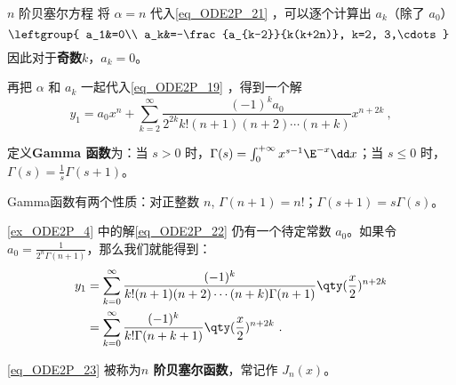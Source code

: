 \begin{example}{$n$ 阶贝塞尔方程}
将 $\alpha=n$ 代入\autoref{eq_ODE2P_21} ，可以逐个计算出 $a_k$（除了 $a_0$）
\begin{equation}
\leftgroup{
    a_1&=0\\
    a_k&=-\frac{a_{k-2}}{k(k+2n)}, k=2, 3,\cdots
}~
\end{equation}
因此对于\textbf{奇数}$k$，$a_k=0$。

再把 $\alpha$ 和 $a_k$ 一起代入\autoref{eq_ODE2P_19} ，得到一个解
\begin{equation}\label{eq_ODE2P_22}
y_1=a_0x^n+\sum\limits^\infty_{k=2}\frac{(-1)^ka_0}{2^{2k}k!(n+1)(n+2)\cdots(n+k)}x^{n+2k}~,
\end{equation}


定义\textbf{Gamma 函数}为：当 $s>0$ 时，$\Gamma(s)=\int_0^{+\infty}x^{s-1}\E^{-x}\dd x$；当 $s\leq 0$ 时，$\Gamma(s)=\frac{1}{s}\Gamma(s+1)$。

Gamma函数有两个性质：对正整数 $n$, $\Gamma(n+1)=n!$；$\Gamma(s+1)=s\Gamma(s)$。

\autoref{ex_ODE2P_4}  中的解\autoref{eq_ODE2P_22} 仍有一个待定常数 $a_0$。如果令 $a_0=\frac{1}{2^n\Gamma(n+1)}$，那么我们就能得到：
\begin{equation}\label{eq_ODE2P_23}
\begin{aligned}
y_1&=\sum\limits^\infty_{k=0}\frac{(-1)^k}{k!(n+1)(n+2)\cdots(n+k)\Gamma(n+1)}\qty(\frac{x}{2})^{n+2k}\\
 &=\sum\limits^\infty_{k=0}\frac{(-1)^k}{k!\Gamma(n+k+1)}\qty(\frac{x}{2})^{n+2k}~.
\end{aligned}
\end{equation}

\autoref{eq_ODE2P_23} 被称为\textbf{$n$ 阶贝塞尔函数}，常记作 $J_n(x)$。


\end{example}



